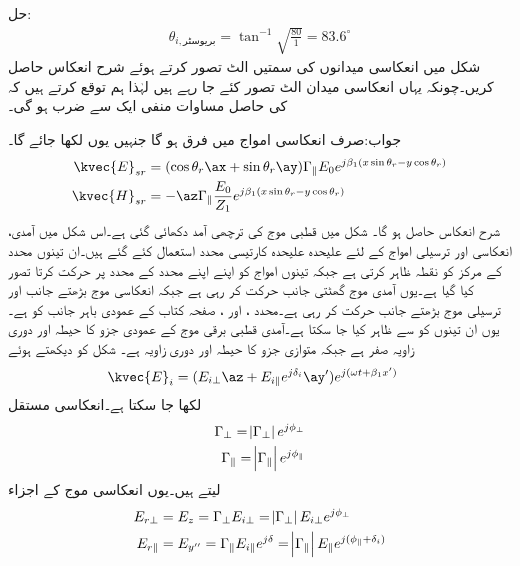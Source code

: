 حل:
\begin{align}
\theta_{i,\text{بریوسٹر}} =\tan^{-1} \sqrt{\frac{80}{1}}=83.6^{\circ}
\end{align} 
شکل  میں انعکاسی میدانوں کی سمتیں الٹ تصور کرتے ہوئے شرح انعکاس  حاصل کریں۔چونکہ یہاں انعکاسی میدان الٹ تصور کئے جا رہے ہیں لہٰذا ہم توقع کرتے ہیں کہ  کی حاصل مساوات منفی ایک سے ضرب ہو گی۔

جواب:صرف انعکاسی امواج میں فرق ہو گا جنہیں یوں لکھا جائے گا۔
\begin{align*}
\kvec{E}_{sr}&= (\cos \theta_r \ax+\sin \theta_r \ay)\Gamma_{\parallel} E_0 e^{ j \beta_1 (x \sin \theta_r-y\cos \theta_r)}\\
\kvec{H}_{sr}&=-\az\Gamma_{\parallel} \frac{ E_0}{Z_1} e^{j \beta_1 (x \sin \theta_r-y\cos \theta_r)}
\end{align*}
شرح انعکاس  حاصل ہو گا۔
شکل  میں قطبی موج کی ترچھی آمد دکھائی گئی ہے۔اس شکل میں آمدی، انعکاسی اور ترسیلی امواج کے لئے علیحدہ علیحدہ کارتیسی محدد استعمال کئے گئے ہیں۔ان تینوں محدد کے مرکز کو نقطہ  ظاہر کرتی ہے جبکہ تینوں امواج کو اپنے اپنے محدد کے  محدد پر حرکت کرتا تصور کیا گیا ہے۔یوں آمدی موج گھٹتی  جانب حرکت کر رہی ہے جبکہ انعکاسی موج  بڑھتے  جانب اور ترسیلی موج بڑھتے  جانب حرکت کر رہی ہے۔محدد ،  اور ،  صفحہ کتاب کے عمودی باہر جانب کو ہے۔یوں ان تینوں کو  سے ظاہر کیا جا سکتا ہے۔آمدی قطبی برقی موج کے عمودی جزو کا حیطہ  اور دوری زاویہ صفر ہے جبکہ متوازی جزو کا حیطہ  اور دوری زاویہ   ہے۔ شکل کو دیکھتے ہوئے 
\begin{align}\label{مساوات_ترچھی_بیضوی__قطبی}
\kvec{E}_i&=(E_{i\perp} \az+E_{i\parallel} e^{j\delta_i}\ay')e^{j(\omega t+\beta_1 x')}
\end{align}
لکھا جا سکتا ہے۔انعکاسی مستقل
\begin{align}
\Gamma_{\perp}=\abs{\Gamma_{\perp}} e^{j\phi_{\perp}}\\
\Gamma_{\parallel}=\abs{\Gamma_{\parallel}} e^{j\phi_{\parallel}}
\end{align}
لیتے ہیں۔یوں انعکاسی موج کے  اجزاء 
\begin{align}
E_{r\perp}&=E_z=\Gamma_{\perp} E_{i\perp}=\abs{\Gamma_{\perp}}E_{i\perp} e^{j\phi_{\perp}}\\
E_{r\parallel}&=E_{y''}=\Gamma_{\parallel} E_{i\parallel}e^{j\delta}=\abs{\Gamma_{\parallel}} E_{\parallel} e^{j(\phi_{\parallel}+\delta_i)}
\end{align}
